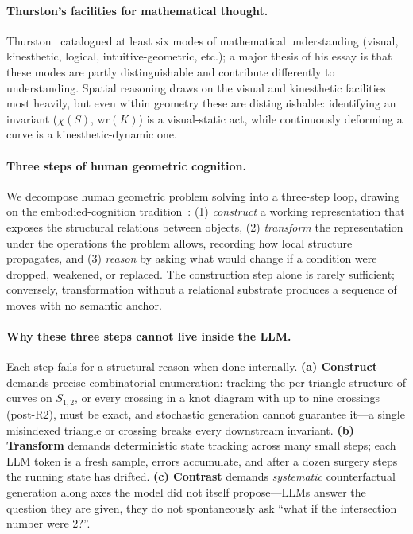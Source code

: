 \documentclass{article}
\begin{document}
\paragraph{Thurston's facilities for mathematical thought.}
Thurston~\citep{thurston1994proof} catalogued at least six modes of mathematical understanding
(visual, kinesthetic, logical, intuitive-geometric, etc.); a major thesis of his essay is
that these modes are partly distinguishable and contribute differently to understanding. Spatial reasoning
draws on the visual and kinesthetic facilities most heavily, but even within geometry
these are distinguishable: identifying an invariant ($\chi(S)$, $\mathrm{wr}(K)$) is a
visual-static act, while continuously deforming a curve is a kinesthetic-dynamic one.

\paragraph{Three steps of human geometric cognition.}
We decompose human geometric problem solving into a three-step loop, drawing on
the embodied-cognition tradition~\citep{lakoff2000mathematics}: (1) \emph{construct} a working representation that exposes the structural
relations between objects, (2) \emph{transform} the representation under the operations
the problem allows, recording how local structure propagates, and (3) \emph{reason} by
asking what would change if a condition were dropped, weakened, or replaced. The
construction step alone is rarely sufficient; conversely, transformation without a
relational substrate produces a sequence of moves with no semantic anchor.

\paragraph{Why these three steps cannot live inside the LLM.}
Each step fails for a structural reason when done internally.
\textbf{(a) Construct} demands precise combinatorial enumeration: tracking
the per-triangle structure of curves on $S_{1,2}$, or every crossing in a knot
diagram with up to nine crossings (post-R2), must be exact, and stochastic
generation cannot guarantee it---a single misindexed triangle or crossing breaks
every downstream invariant.
\textbf{(b) Transform} demands deterministic state tracking across many small
steps; each LLM token is a fresh sample, errors accumulate, and after a dozen
surgery steps the running state has drifted.
\textbf{(c) Contrast} demands \emph{systematic} counterfactual generation along
axes the model did not itself propose---LLMs answer the question they are given,
they do not spontaneously ask ``what if the intersection number were $2$?''.
\end{document}
